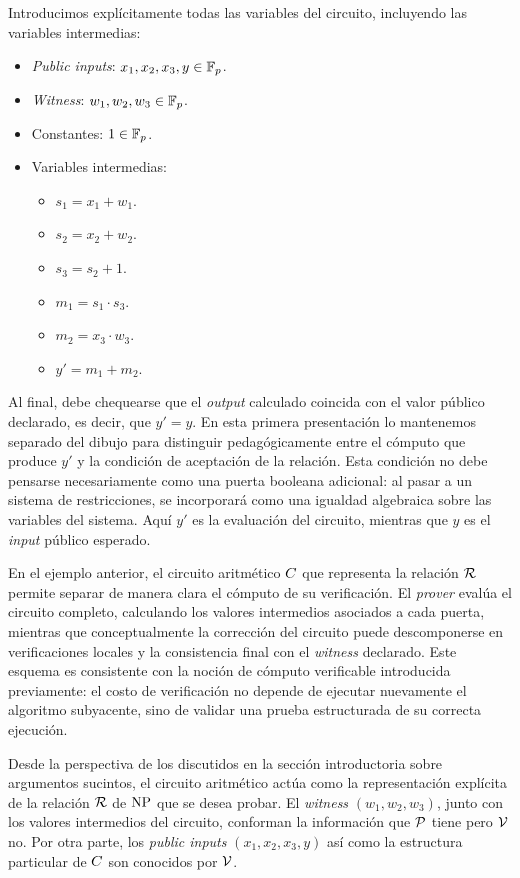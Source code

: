 Introducimos explícitamente todas las variables del circuito, incluyendo las variables intermedias:

\begin{itemize}[noitemsep]
		\item \textit{Public inputs}: $x_1, x_2, x_3, y \in \mathbb{F}_p$.
		\item \textit{Witness}: $w_1, w_2, w_3 \in \mathbb{F}_p$.
	\item Constantes: $1 \in \mathbb{F}_p$.
	\item Variables intermedias:
	\begin{itemize}[noitemsep]
		\item $s_1 = x_1 + w_1$.
		\item $s_2 = x_2 + w_2$.
		\item $s_3 = s_2 + 1$.
		\item $m_1 = s_1 \cdot s_3$.
		\item $m_2 = x_3 \cdot w_3$.
		\item $y' = m_1 + m_2$.
	\end{itemize}
\end{itemize}

Al final, debe chequearse que el \textit{output} calculado coincida con el valor público declarado, es decir, que $y' = y$. En esta primera presentación lo mantenemos separado del dibujo para distinguir pedagógicamente entre el cómputo que produce $y'$ y la condición de aceptación de la relación. Esta condición no debe pensarse necesariamente como una puerta booleana adicional: al pasar a un sistema de restricciones, se incorporará como una igualdad algebraica sobre las variables del sistema. Aquí $y'$ es la evaluación del circuito, mientras que $y$ es el \textit{input} público esperado.

En el ejemplo anterior, el circuito aritmético $C$ que representa la relación $\mathcal{R}$ permite separar de manera clara el cómputo de su verificación. El \textit{prover} evalúa el circuito completo, calculando los valores intermedios asociados a cada puerta, mientras que conceptualmente la corrección del circuito puede descomponerse en verificaciones locales y la consistencia final con el \textit{witness} declarado. Este esquema es consistente con la noción de cómputo verificable introducida previamente: el costo de verificación no depende de ejecutar nuevamente el algoritmo subyacente, sino de validar una prueba estructurada de su correcta ejecución.

Desde la perspectiva de los \SNARK discutidos en la sección introductoria sobre argumentos sucintos, el circuito aritmético actúa como la representación explícita de la relación $\mathcal{R}$ de $\mathrm{NP}$ que se desea probar. El \textit{witness} $(w_1, w_2, w_3)$, junto con los valores intermedios del circuito, conforman la información que $\mathcal{P}$ tiene pero $\mathcal{V}$ no. Por otra parte, los \textit{public inputs} $(x_1,x_2,x_3,y)$ así como la estructura particular de $C$ son conocidos por $\mathcal{V}$.

